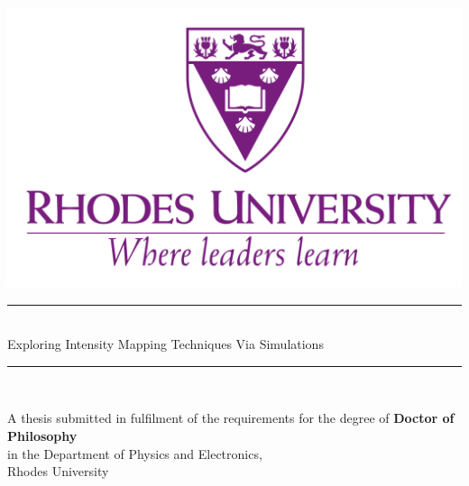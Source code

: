 \begin{titlepage}

\newcommand{\HRule}{\rule{\linewidth}{0.5mm}} %

\center %
 

\includegraphics[width=0.4\columnwidth]{Images/Rhode}\\[1cm] %



\HRule \\[0.4cm]
{ \huge Exploring Intensity Mapping Techniques Via Simulations}\\[0.4cm]
\HRule \\[1.5cm]


\begin{center}
 {\large A thesis submitted in fulfilment of the requirements for the degree of \textbf{Doctor of Philosophy}} \\
 {\large in the Department of Physics and Electronics,} \\
 {\large Rhodes University}
\end{center}
\vspace{0.02\textheight}



\end{titlepage}
